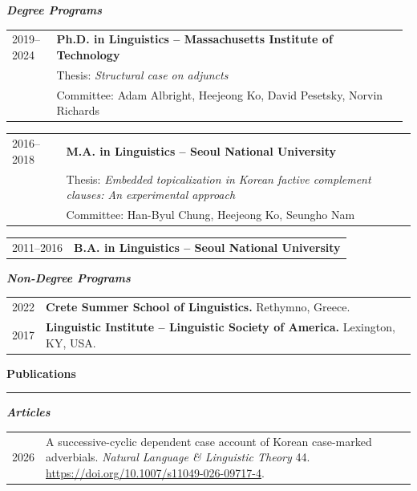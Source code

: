 \documentclass[10pt]{article}
\makeatletter
\newcommand{\sect}[1]{\vspace{5mm} {\fontsize{14}{21}\selectfont \textbf{#1}} {\vspace{0.1cm}} \hrule {\vspace{0.3cm}}}
\newcommand{\subsect}[1]{\vspace{3mm} {\fontsize{11}{18}\selectfont \textit{\textbf{#1}}} {\vspace{0.3cm}}}
\newcommand{\paper}[2]{\begin{tabular}{@{}p{0.11\textwidth}p{0.87\textwidth}}{#1}&{#2}\\\end{tabular}\vspace{2mm}}
\makeatother
\begin{document}
\subsect{Degree Programs}

\begin{tabular}{@{}p{0.11\linewidth}p{0.87\linewidth}}
{2019--2024}&{\textbf{Ph.D. in Linguistics -- Massachusetts Institute of Technology}}\\
{}&{Thesis: {\textit{Structural case on adjuncts}}}\\
{}&{Committee: Adam Albright, Heejeong Ko, David Pesetsky, Norvin Richards}
\end{tabular}

\vspace{2mm}

\begin{tabular}{@{}p{}p{}}
{2016--2018}&{\textbf{M.A. in Linguistics -- Seoul National University}}\\
{}&{Thesis: {\textit{Embedded topicalization in Korean factive complement clauses: An experimental approach}}}\\
                  {}&{Committee: Han-Byul Chung, Heejeong Ko, Seungho Nam}\\
 \end{tabular}

\vspace{2mm}

\begin{tabular}{@{}p{}p{}}
{2011--2016}&{\textbf{B.A. in Linguistics -- Seoul National University}}\\
\end{tabular}

\vspace{2mm}

\subsect{Non-Degree Programs}

\begin{tabular}{@{}p{}p{}}
{2022}&{{\textbf{Crete Summer School of Linguistics.}} Rethymno, Greece.}\\
{2017}&{\textbf{Linguistic Institute -- Linguistic Society of America.} Lexington, KY, USA.}\\
\end{tabular}


{\sect{Publications}}

{\subsect{Articles}}

\paper{2026}{A successive-cyclic dependent case account of Korean case-marked adverbials. {\textit{Natural Language {\&} Linguistic Theory}} 44. {\href{https://doi.org/10.1007/s11049-026-09717-4}{https://doi.org/10.1007/s11049-026-09717-4}}.}
\end{document}
